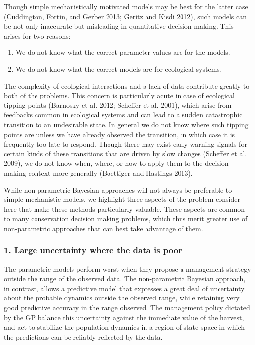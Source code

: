\documentclass[author-year, review]{elsarticle} %
\begin{document}
Though simple mechanistically motivated models may be best for the
latter case (Cuddington, Fortin, and Gerber 2013; Geritz and Kisdi
2012), such models can be not only inaccurate but misleading in
quantitative decision making. This arises for two reasons:

\begin{enumerate}
\def\labelenumi{\arabic{enumi}.}
\itemsep1pt\parskip0pt
\item
  We do not know what the correct parameter values are for the models.
\item
  We do not know what the correct models are for ecological systems.
\end{enumerate}

The complexity of ecological interactions and a lack of data contribute
greatly to both of the problems. This concern is particularly acute in
case of ecological tipping points (Barnosky et al. 2012; Scheffer et al.
2001), which arise from feedbacks common in ecological systems and can
lead to a sudden catastrophic transition to an undesirable state. In
general we do not know where such tipping points are unless we have
already observed the transition, in which case it is frequently too late
to respond. Though there may exist early warning signals for certain
kinds of these transitions that are driven by slow changes (Scheffer et
al. 2009), we do not know when, where, or how to apply them to the
decision making context more generally (Boettiger and Hastings 2013).

While non-parametric Bayesian approaches will not always be preferable
to simple mechanistic models, we highlight three aspects of the problem
consider here that make these methods particularly valuable. These
aspects are common to many conservation decision making problems, which
thus merit greater use of non-parametric approaches that can best take
advantage of them.

\subsubsection{1. Large uncertainty where the data is poor}

The parametric models perform worst when they propose a management
strategy outside the range of the observed data. The non-parametric
Bayesian approach, in contrast, allows a predictive model that expresses
a great deal of uncertainty about the probable dynamics outside the
observed range, while retaining very good predictive accuracy in the
range observed. The management policy dictated by the GP balance this
uncertainty against the immediate value of the harvest, and act to
stabilize the population dynamics in a region of state space in which
the predictions can be reliably reflected by the data.
\end{document}
